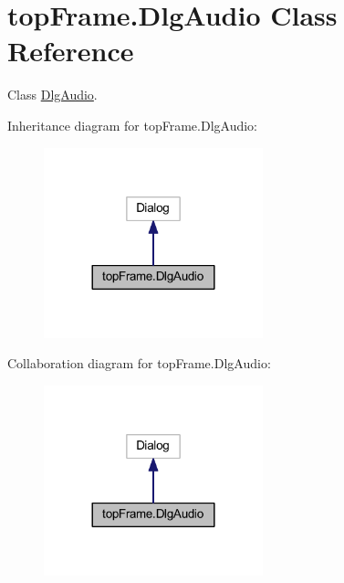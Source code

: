\hypertarget{classtop_frame_1_1_dlg_audio}{\section{top\-Frame.\-Dlg\-Audio Class Reference}
\label{classtop_frame_1_1_dlg_audio}
}


Class \hyperlink{classtop_frame_1_1_dlg_audio}{Dlg\-Audio}.  




Inheritance diagram for top\-Frame.\-Dlg\-Audio\-:\nopagebreak
\begin{figure}[H]
\begin{center}
\leavevmode
\includegraphics[width=180pt]{classtop_frame_1_1_dlg_audio__inherit__graph}
\end{center}
\end{figure}


Collaboration diagram for top\-Frame.\-Dlg\-Audio\-:\nopagebreak
\begin{figure}[H]
\begin{center}
\leavevmode
\includegraphics[width=180pt]{classtop_frame_1_1_dlg_audio__coll__graph}
\end{center}
\end{figure}
